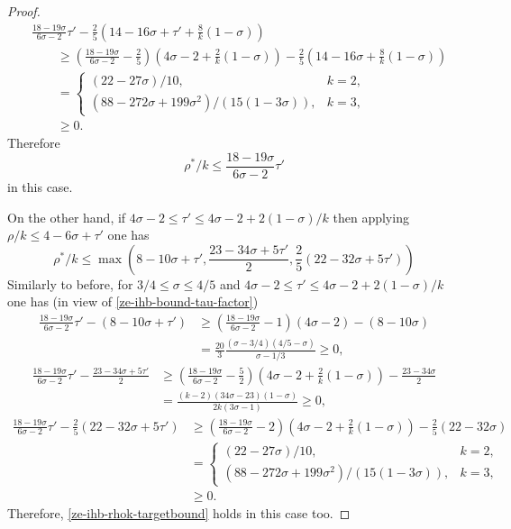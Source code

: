 \begin{proof}
\begin{align*}
&\frac{18 - 19\sigma}{6\sigma - 2}\tau' - \frac{2}{5}(14 - 16\sigma + \tau' + \frac{8}{k}(1 - \sigma)) \\
&\qquad\ge \left(\frac{18 - 19\sigma}{6\sigma - 2} - \frac{2}{5}\right)(4\sigma - 2 + \frac{2}{k}(1 - \sigma)) - \frac{2}{5}(14 - 16\sigma + \frac{8}{k}(1 - \sigma))\\
&\qquad= \begin{cases}
(22 - 27\sigma)/10,&k = 2,\\
(88 - 272\sigma + 199\sigma^2)/(15(1 - 3\sigma)),&k=3,
\end{cases}\\
&\qquad\ge 0.
\end{align*}
Therefore
\begin{equation}\label{ze-ihb-rhok-targetbound}
\rho^*/k \le \frac{18 - 19\sigma}{6\sigma - 2}\tau'
\end{equation}
in this case.

On the other hand, if $4\sigma - 2 \le \tau' \le 4\sigma - 2 + 2(1 - \sigma)/k$ then applying $\rho/k \le 4 - 6\sigma + \tau'$ one has
\[
\rho^*/k \le \max(8 -10\sigma + \tau',\frac{23 - 34\sigma + 5\tau'}{2}, \frac{2}{5}(22 - 32\sigma +  5\tau'))
\]
Similarly to before, for $3/4 \le \sigma \le 4/5$ and $4\sigma - 2 \le \tau' \le 4\sigma - 2 + 2(1 - \sigma)/k$ one has (in view of \eqref{ze-ihb-bound-tau-factor})
\begin{align*}
\frac{18 - 19\sigma}{6\sigma - 2}\tau' - (8 - 10\sigma + \tau') &\ge \left(\frac{18 - 19\sigma}{6\sigma - 2} - 1\right)(4\sigma - 2) - (8 - 10\sigma) \\
&= \frac{20}{3}\frac{(\sigma - 3/4) (4/5 - \sigma)}{\sigma - 1/3} \ge 0,
\end{align*}
\begin{align*}
\frac{18 - 19\sigma}{6\sigma - 2}\tau' - \frac{23 - 34\sigma + 5\tau'}{2} &\ge \left(\frac{18 - 19\sigma}{6\sigma - 2} - \frac{5}{2}\right)(4\sigma - 2 + \frac{2}{k}(1 - \sigma)) - \frac{23 - 34\sigma}{2}\\
&= \frac{(k - 2)(34\sigma - 23)(1 - \sigma)}{2k(3\sigma - 1)} \ge 0,
\end{align*}
\begin{align*}
\frac{18 - 19\sigma}{6\sigma - 2}\tau' - \frac{2}{5}(22 - 32\sigma +  5\tau') &\ge \left(\frac{18 - 19\sigma}{6\sigma - 2} - 2\right)(4\sigma - 2 + \frac{2}{k}(1 - \sigma)) - \frac{2}{5}(22 - 32\sigma)\\
&= \begin{cases}
(22 - 27\sigma)/10,&k = 2,\\
(88 - 272\sigma + 199\sigma^2)/(15(1 - 3\sigma)),&k=3,
\end{cases}\\
&\ge 0.
\end{align*}
Therefore, \eqref{ze-ihb-rhok-targetbound} holds in this case too.


\end{proof}
